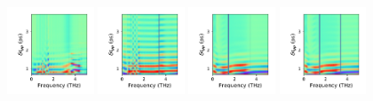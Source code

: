 \documentclass[a4paper]{article}
\begin{document}
\begin{figure}[H]
  \centering
  \includegraphics[width=0.23\textwidth]{cond_pcolor-A3-v5-imp0.pdf}
  \includegraphics[width=0.23\textwidth]{cond_pcolor-A3-v5-imp1.pdf}
  \includegraphics[width=0.23\textwidth]{cond_pcolor-A3-v5-imp2.pdf}
  \includegraphics[width=0.23\textwidth]{cond_pcolor-A3-v5-imp3.pdf}
\end{figure}
\end{document}
